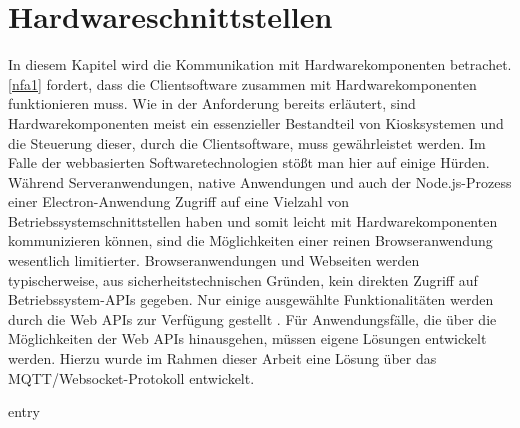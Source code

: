 \chapter{Hardwareschnittstellen}
\label{chap:hardwareschnittstellen}

In diesem Kapitel wird die Kommunikation mit Hardwarekomponenten betrachet.
\ref{nfa1} fordert, dass die Clientsoftware zusammen mit Hardwarekomponenten funktionieren muss. Wie in
der Anforderung bereits erläutert, sind Hardwarekomponenten meist ein essenzieller Bestandteil von Kiosksystemen
und die Steuerung dieser, durch die Clientsoftware, muss gewährleistet werden. Im Falle der webbasierten 
Softwaretechnologien stößt man hier auf einige Hürden.\\
Während Serveranwendungen, native Anwendungen und auch der Node.js-Prozess einer 
Electron-Anwendung Zugriff auf eine Vielzahl von Betriebssystemschnittstellen haben 
und somit leicht mit Hardwarekomponenten kommunizieren können, sind
die Möglichkeiten einer reinen Browseranwendung wesentlich limitierter. Browseranwendungen und Webseiten werden
typischerweise, aus sicherheitstechnischen Gründen, kein direkten Zugriff auf Betriebssystem-APIs gegeben.
Nur einige ausgewählte Funktionalitäten werden durch die Web APIs zur Verfügung gestellt \cite{web-apis}.
Für Anwendungsfälle, die über die Möglichkeiten der Web APIs hinausgehen, müssen eigene Lösungen entwickelt 
werden. Hierzu wurde im Rahmen dieser Arbeit eine Lösung über das MQTT/Websocket-Protokoll entwickelt.


{entry}